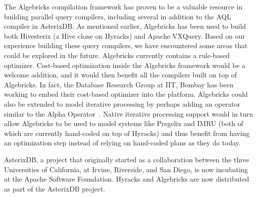 The Algebricks compilation framework has proven to be a valuable resource in building parallel query compilers, including several in addition to the AQL compiler in AsterixDB. As mentioned earlier, Algebricks has been used to build both Hivesterix (a Hive clone on Hyracks) and Apache VXQuery. Based on our experience building these query compilers, we have encountered some areas that could be explored in the future. Algebricks currently contains a rule-based optimizer. Cost-based optimization inside the Algebricks framework would be a welcome addition, and it would then benefit all the compilers built on top of Algebricks. In fact, the Database Research Group at IIT, Bombay has been working to embed their cost-based optimizer into the platform. Algebricks could also be extended to model iterative processing by perhaps adding an operator similar to the Alpha Operator~\cite{DBLP:journals/tse/Agrawal88}. Native iterative processing support would in turn allow Algebricks to be used to model systems like Pregelix and IMRU (both of which are currently hand-coded on top of Hyracks) and thus benefit from having an optimization step instead of relying on hand-coded plans as they do today.

AsterixDB, a project that originally started as a collaboration between the three Universities of California, at Irvine, Riverside, and San Diego, is now incubating at the Apache Software Foundation. Hyracks and Algebricks are now distributed as part of the AsterixDB project.
